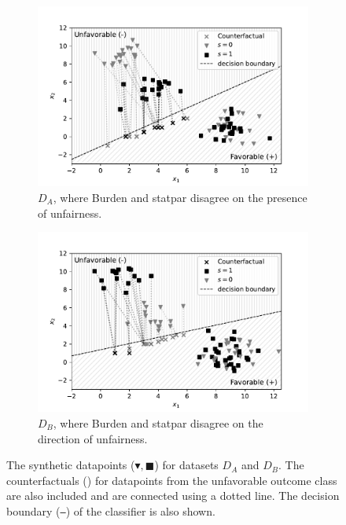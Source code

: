 \documentclass[runningheads]{llncs}
\begin{document}
\begin{figure}
    \centering
    \begin{subfigure}{0.49\textwidth}
        \includegraphics[width=\textwidth]{img/syndata-A-bw}
        \caption{$D_A$, where \gls{Burden} and \gls{statpar} disagree on the presence of unfairness.}
        \label{fig:syndatafavor}
    \end{subfigure}
    \begin{subfigure}{0.49\textwidth}
        \includegraphics[width=\textwidth]{img/syndata-B-bw}
        \caption{$D_B$, where \gls{Burden} and \gls{statpar} disagree on the direction of unfairness.}
        \label{fig:syndataunfavor}
    \end{subfigure}
    \caption{The synthetic datapoints ($\blacktriangledown,\blacksquare$) for datasets $D_A$ and $D_B$. The counterfactuals (\texttimes) for datapoints from the unfavorable outcome class are also included and are connected using a dotted line. The decision boundary (\texttt{---}) of the classifier is also shown.}
    \label{fig:syndataplot}
\end{figure}
\end{document}
